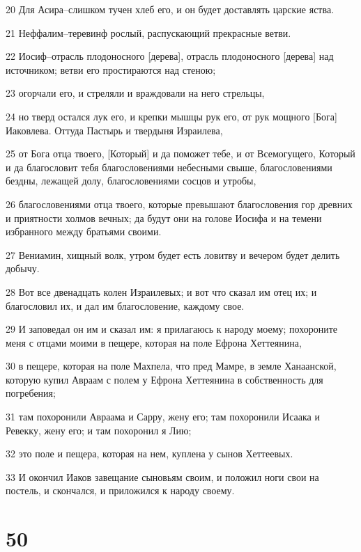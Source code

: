 \par 20 Для Асира--слишком тучен хлеб его, и он будет доставлять царские яства.
\par 21 Неффалим--теревинф рослый, распускающий прекрасные ветви.
\par 22 Иосиф--отрасль плодоносного [дерева], отрасль плодоносного [дерева] над источником; ветви его простираются над стеною;
\par 23 огорчали его, и стреляли и враждовали на него стрельцы,
\par 24 но тверд остался лук его, и крепки мышцы рук его, от рук мощного [Бога] Иаковлева. Оттуда Пастырь и твердыня Израилева,
\par 25 от Бога отца твоего, [Который] и да поможет тебе, и от Всемогущего, Который и да благословит тебя благословениями небесными свыше, благословениями бездны, лежащей долу, благословениями сосцов и утробы,
\par 26 благословениями отца твоего, которые превышают благословения гор древних и приятности холмов вечных; да будут они на голове Иосифа и на темени избранного между братьями своими.
\par 27 Вениамин, хищный волк, утром будет есть ловитву и вечером будет делить добычу.
\par 28 Вот все двенадцать колен Израилевых; и вот что сказал им отец их; и благословил их, и дал им благословение, каждому свое.
\par 29 И заповедал он им и сказал им: я прилагаюсь к народу моему; похороните меня с отцами моими в пещере, которая на поле Ефрона Хеттеянина,
\par 30 в пещере, которая на поле Махпела, что пред Мамре, в земле Ханаанской, которую купил Авраам с полем у Ефрона Хеттеянина в собственность для погребения;
\par 31 там похоронили Авраама и Сарру, жену его; там похоронили Исаака и Ревекку, жену его; и там похоронил я Лию;
\par 32 это поле и пещера, которая на нем, куплена у сынов Хеттеевых.
\par 33 И окончил Иаков завещание сыновьям своим, и положил ноги свои на постель, и скончался, и приложился к народу своему.

\chapter{50}

